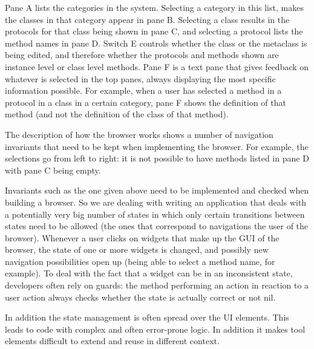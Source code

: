 \documentclass[a4paper,10pt,twoside]{book}
\begin{document}

Pane A lists the categories in the system. Selecting a category in this list, makes the classes in that category appear in pane B. Selecting a class results in the protocols for that class being shown in pane C, and selecting a protocol lists the method names in pane D. Switch E controls whether the class or the metaclass is being edited, and therefore whether the protocols and methods shown are instance level or class level methods. Pane F is a text pane that gives feedback on whatever is selected in the top panes, always displaying the most specific information possible. For example, when a user has selected a method in a protocol in a class in a certain category, pane F shows the definition of that method (and not the definition of the class of that method). 

The description of how the browser works shows a number of navigation invariants that need to be kept when implementing the browser. For example, the selections go from left to right: it is not possible to have methods listed in pane D with pane C being empty.

Invariants such as the one given above need to be implemented and checked when building a browser. So we are dealing with writing an application that deals with a potentially very big number of states in which only certain transitions between states need to be allowed (the ones that correspond to navigations the user of the browser). Whenever a user clicks on widgets that make up the GUI of the browser, the state of one or more widgets is changed, and possibly new navigation possibilities open up (being able to select a method name, for example). To deal with the fact that a widget can be in an inconsistent state, developers often rely on guards: the method performing an action in reaction to a user action always checks whether the state is actually correct or not nil. 

In addition the state management is often spread over the UI elements. This leads to code with complex and often error-prone logic. In addition it makes tool elements difficult to extend and reuse in different context.
\end{document}
